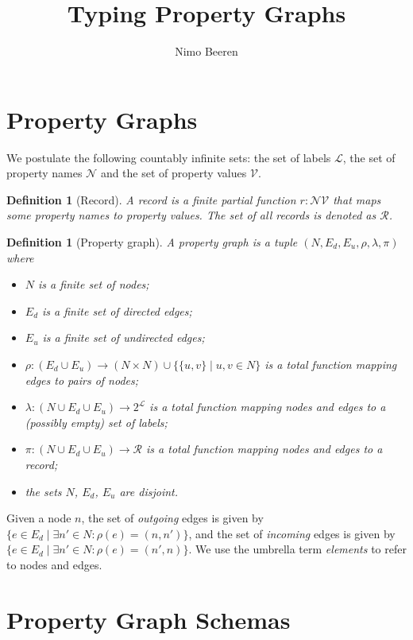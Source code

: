 \documentclass[a4paper]{article}
\title{Typing Property Graphs}
\author{Nimo Beeren}
\makeatletter
\newtheorem{definition}[theorem]{Definition}
\newcommand{\pto}{}%
\DeclareRobustCommand{\pto}{\mathrel{\mathpalette\p@to@gets\to}}
\newcommand{\p@to@gets}[2]{%
  \ooalign{\hidewidth$\m@th#1\mapstochar\mkern5mu$\hidewidth\cr$\m@th#1\to$\cr}%
}
\makeatother
\begin{document}
\section{Property Graphs}

We postulate the following countably infinite sets: the set of labels $\mathcal{L}$, the set of property names $\mathcal{N}$ and the set of property values $\mathcal{V}$.

\begin{definition}[Record]
  A \emph{record} is a finite partial function $r : \mathcal{N} \pto \mathcal{V}$ that maps some property names to property values. The set of all records is denoted as $\mathcal{R}$.
\end{definition}

\begin{definition}[Property graph]
  A \emph{property graph} is a tuple $(N, E_d, E_u, \rho, \lambda, \pi)$ where
  \begin{itemize}
    \item $N$ is a finite set of nodes;
    \item $E_d$ is a finite set of directed edges;
    \item $E_u$ is a finite set of undirected edges;
    \item $\rho : (E_d \cup E_u) \to (N \times N) \cup \{\{u, v\} \mid u, v \in N\}$ is a total function mapping edges to pairs of nodes;
    \item $\lambda : (N \cup E_d \cup E_u) \to 2^{\mathcal{L}}$ is a total function mapping nodes and edges to a (possibly empty) set of labels;
    \item $\pi : (N \cup E_d \cup E_u) \to \mathcal{R}$ is a total function mapping nodes and edges to a record;
    \item the sets $N$, $E_d$, $E_u$ are disjoint.
  \end{itemize}
\end{definition}

Given a node $n$, the set of \emph{outgoing} edges is given by $\{e \in E_d \mid \exists n' \in N : \rho(e) = (n, n')\}$, and the set of \emph{incoming} edges is given by $\{e \in E_d \mid \exists n' \in N : \rho(e) = (n', n)\}$. We use the umbrella term \emph{elements} to refer to nodes and edges.

\section{Property Graph Schemas}
\end{document}
